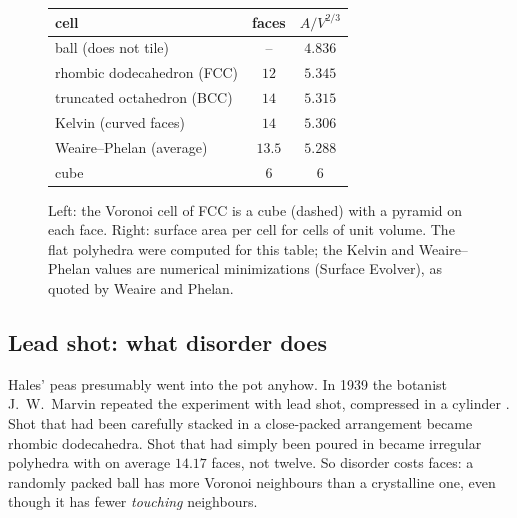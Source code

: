 \documentclass[11pt,openany]{book}
\theoremstyle{plain}
\theoremstyle{definition}
\theoremstyle{remark}
\begin{document}
\begin{figure}[ht]
\centering
\begin{minipage}{0.47\textwidth}
\centering
{}
\end{minipage}\hfill
\begin{minipage}{0.5\textwidth}
\centering\small
\renewcommand{\arraystretch}{1.15}
\begin{tabular}{lcc}
\toprule
cell & faces & $A/V^{2/3}$\\
\midrule
ball (does not tile) & -- & $4.836$\\
rhombic dodecahedron (FCC) & $12$ & $5.345$\\
truncated octahedron (BCC) & $14$ & $5.315$\\
Kelvin (curved faces) & $14$ & $5.306$\\
Weaire--Phelan (average) & $13.5$ & $5.288$\\
cube & $6$ & $6$\\
\bottomrule
\end{tabular}
\end{minipage}
\caption{Left: the Voronoi cell of FCC is a cube (dashed) with a pyramid on each face. Right: surface area
per cell for cells of unit volume. The flat polyhedra were computed for this table; the Kelvin and
Weaire--Phelan values are numerical minimizations (Surface Evolver), as quoted by Weaire and
Phelan.}
\label{PHYS:fig:rd}
\end{figure}

\subsection*{Lead shot: what disorder does}
Hales' peas presumably went into the pot anyhow. In 1939 the botanist J.~W.~Marvin repeated the experiment with
lead shot, compressed in a cylinder . Shot that had been carefully stacked in a
close-packed arrangement became rhombic dodecahedra. Shot that had simply been poured in became
irregular polyhedra with on average $14.17$ faces, not twelve. So disorder costs faces: a randomly packed ball has
more Voronoi neighbours than a crystalline one, even though it has fewer \emph{touching} neighbours.
\end{document}
